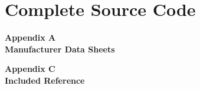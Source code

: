 \documentclass[letter]{report}
\begin{document}
	
	\printbibliography		
	
	\section{Complete Source Code}
		
	
	\begin{appendices}
		\begin{center}
			\textbf{\vspace{0.35\textheight}\Huge Appendix A\label{app:mq6} \\Manufacturer Data Sheets}
			\newpage	
		\end{center}
		
		 
		\newpage
		
		\newpage
		
		\newpage
		
		
		
		\begin{center}
			\textbf{\vspace{0.35\textheight}\Huge Appendix C\label{refs} \\Included Reference}
			\newpage
		\end{center}
	
	\end{appendices}	
\end{document}
